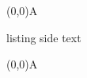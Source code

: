 \documentclass{article}
\begin{document}
\begin{erdiagram}
  (0,0){A}
\end{erdiagram}

\begin{tcblisting}{listing side text}
\begin{erdiagram}
  (0,0){A}
\end{erdiagram}
\end{tcblisting}
\end{document}
